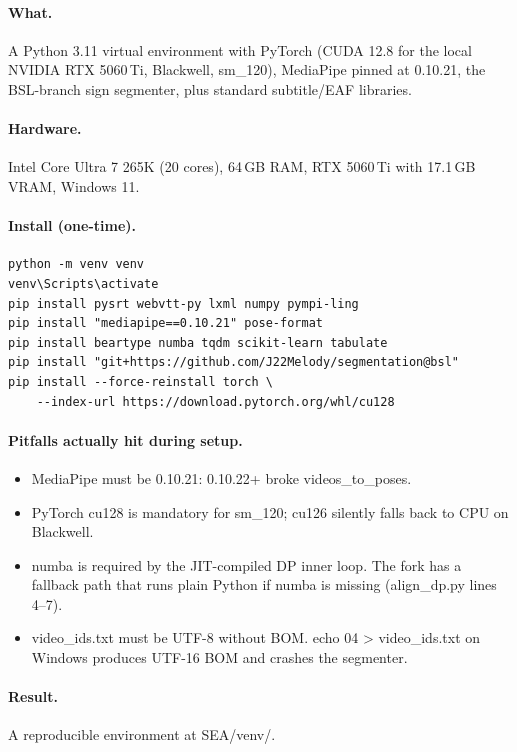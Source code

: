 \documentclass[11pt,a4paper]{article}
\def\texttt#1{#1}%
\def\textbf#1{#1}%
\begin{document}
\paragraph{What.} A Python 3.11 virtual environment with PyTorch (CUDA 12.8
for the local NVIDIA RTX 5060\,Ti, Blackwell, sm\_120), MediaPipe pinned at
\texttt{0.10.21}, the BSL-branch sign segmenter, plus standard subtitle/EAF
libraries.

\paragraph{Hardware.} Intel Core Ultra 7 265K (20 cores), 64\,GB RAM, RTX
5060\,Ti with 17.1\,GB VRAM, Windows 11.

\paragraph{Install (one-time).}
\begin{lstlisting}
python -m venv venv
venv\Scripts\activate
pip install pysrt webvtt-py lxml numpy pympi-ling
pip install "mediapipe==0.10.21" pose-format
pip install beartype numba tqdm scikit-learn tabulate
pip install "git+https://github.com/J22Melody/segmentation@bsl"
pip install --force-reinstall torch \
    --index-url https://download.pytorch.org/whl/cu128
\end{lstlisting}

\paragraph{Pitfalls actually hit during setup.}
\begin{itemize}[leftmargin=1.5em]
  \item \textbf{MediaPipe must be 0.10.21}: 0.10.22+ broke
  \texttt{videos\_to\_poses}.
  \item \textbf{PyTorch \texttt{cu128}} is mandatory for sm\_120; cu126
  silently falls back to CPU on Blackwell.
  \item \texttt{numba} is required by the JIT-compiled DP inner loop. The
  fork has a fallback path that runs plain Python if numba is missing
  (\texttt{align\_dp.py} lines 4--7).
  \item \texttt{video\_ids.txt} must be UTF-8 without BOM. \texttt{echo 04 >
  video\_ids.txt} on Windows produces UTF-16 BOM and crashes the segmenter.
\end{itemize}

\paragraph{Result.} A reproducible environment at \texttt{SEA/venv/}.
\end{document}
